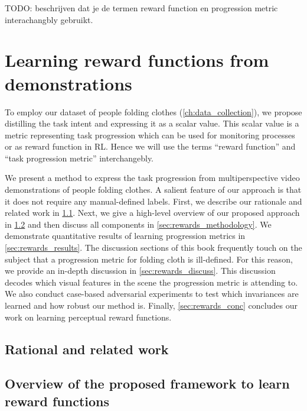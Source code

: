 \documentclass[\home/main.tex]{subfiles}
\begin{document}
TODO: beschrijven dat je de termen reward function en progression metric interachangbly gebruikt. 

\chapter{Learning reward functions from demonstrations}\label{ch:reward_functions}

To employ our dataset of people folding clothes (\cref{ch:data_collection}), we propose distilling the task intent and expressing it as a scalar value. This scalar value is a metric representing task progression which can be used for monitoring processes or as reward function in \gls{RL}. Hence we will use the terms \enquote{reward function} and \enquote{task progression metric} interchangebly. 

We present a method to express the task progression from multiperspective video demonstrations of people folding clothes. A salient feature of our approach is that it does not require any manual-defined labels. First, we describe our rationale and related work in \cref{sec:rewards_rationale}. Next, we give a high-level overview of our proposed approach in \cref{sec:rewards_overview} and then discuss all components in \cref{sec:rewards_methodology}. We demonstrate quantitative results of learning progression metrics in \cref{sec:rewards_results}. The discussion sections of this book frequently touch on the subject that a progression metric for folding cloth is ill-defined. For this reason, we provide an in-depth discussion in \cref{sec:rewards_discuss}. This discussion decodes which visual features in the scene the progression metric is attending to. We also conduct case-based adversarial experiments to test which invariances are learned and how robust our method is. Finally, \cref{sec:rewards_conc} concludes our work on learning perceptual reward functions.

\section{Rational and related work} \label{sec:rewards_rationale}

\section{Overview of the proposed framework to learn reward functions} \label{sec:rewards_overview}
\end{document}
